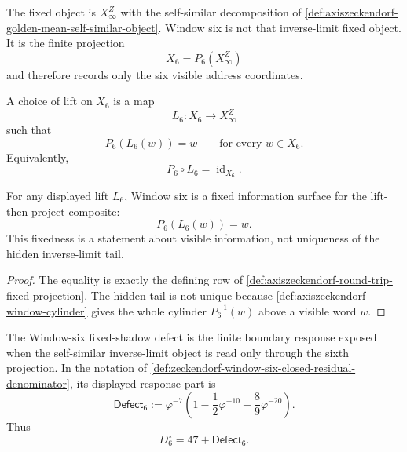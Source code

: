 

\begin{principle}
\label{prin:axiszeckendorf-window-six-not-fixed-object}
The fixed object is $X_\infty^Z$ with the self-similar decomposition of
\autoref{def:axiszeckendorf-golden-mean-self-similar-object}.  Window six is
not that inverse-limit fixed object.  It is the finite projection
$$
X_6=P_6(X_\infty^Z)
$$
and therefore records only the six visible address coordinates.
\end{principle}

\begin{definition}
\label{def:axiszeckendorf-round-trip-fixed-projection}
A choice of lift on $X_6$ is a map
$$
L_6:X_6\to X_\infty^Z
$$
such that
$$
P_6(L_6(w))=w
\qquad
\text{for every }w\in X_6.
$$
Equivalently,
$$
P_6\circ L_6=\operatorname{id}_{X_6}.
$$
\end{definition}

\begin{proposition}
\label{prop:axiszeckendorf-window-six-fixed-visible-information}
For any displayed lift $L_6$, Window six is a fixed information surface for
the lift-then-project composite:
$$
P_6(L_6(w))=w.
$$
This fixedness is a statement about visible information, not uniqueness of
the hidden inverse-limit tail.
\end{proposition}

\begin{proof}
The equality is exactly the defining row of
\autoref{def:axiszeckendorf-round-trip-fixed-projection}.  The hidden tail
is not unique because \autoref{def:axiszeckendorf-window-cylinder} gives the
whole cylinder $P_6^{-1}(w)$ above a visible word $w$.
\end{proof}

\begin{definition}
\label{def:axiszeckendorf-window-six-fixed-shadow-defect}
The Window-six fixed-shadow defect is the finite boundary response exposed
when the self-similar inverse-limit object is read only through the sixth
projection.  In the notation of
\autoref{def:zeckendorf-window-six-closed-residual-denominator}, its
displayed response part is
$$
\mathsf{Defect}_6
:=
\varphi^{-7}
\left(
1-\frac{1}{2}\varphi^{-10}
+\frac{8}{9}\varphi^{-20}
\right).
$$
Thus
$$
D_6^\star=47+\mathsf{Defect}_6.
$$
\end{definition}


